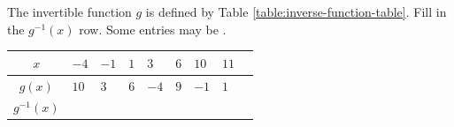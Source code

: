 \begin{myPrep}
\begin{multicols}{2}
\begin{center}
			\label{fig:unit-circle-coterminal-fourth-quadrant}
		\end{center}
	\end{multicols}
\end{myPrep}

\begin{myPrep}
	\begin{multicols}{2}
	The invertible function $g$ is defined by Table \ref{table:inverse-function-table}. Fill in the $g^{-1}(x)$ row. Some entries may be .
	\columnbreak
			\begin{center}\captionsetup{type=table}\label{table:inverse-function-table}
			\renewcommand{\arraystretch}{1} 
				\begin{tabular}{|| c | P{.6cm} | P{.6cm} | P{.6cm} | P{.6cm} | P{.6cm} | P{.6cm} | P{.6cm} | P{.6cm} ||}
					\hline
					$x$    & $-4$ & $-1$ & $1$ & $3$ & $6$ & $10$ & $11$\\
					\hline
					$g(x)$ & $10$ & $3$ & $6$ & $-4$ & $9$ & $-1$ & $1$\\ 
					\hline
					$g^{-1}(x)$ & & & & & & &\\ 
					\hline
				\end{tabular}
			\end{center}
	\end{multicols}
\end{myPrep}

